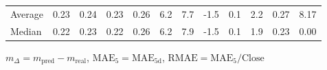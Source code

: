 \begin{threeparttable}
{\begin{tabular}{lrrrrrrrrrrr}
Average &          0.23 &          0.24 &          0.23 &        0.26 &                 6.2 &                 7.7 &       -1.5 &                 0.1 &              2.2 &            0.27 &                   8.17 \\
 Median &          0.22 &          0.23 &          0.22 &        0.26 &                 6.2 &                 7.9 &       -1.5 &                 0.1 &              1.9 &            0.23 &                   0.00 \\
\bottomrule
\end{tabular}
}
\begin{tablenotes}\footnotesize
\item $m_\Delta=m_{\text{pred}}-m_{\text{real}}$,
$\mathrm{MAE}_5=\mathrm{MAE}_{5\text{d}}$,
$\mathrm{RMAE}=\mathrm{MAE}_5/\text{Close}$
\end{tablenotes}
\end{threeparttable}
\endgroup

